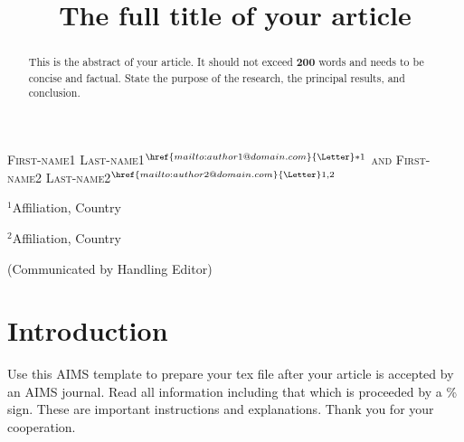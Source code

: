 \documentclass{aims} %
\title[Running head]
{The full title of your article} %
\author[First-name1 Last-name1 and First-name2 Last-name2]{}
\theoremstyle{definition}
\begin{document}
\maketitle

\centerline{\scshape
First-name1 Last-name1$^{{\href{mailto:author1@domain.com}{\textrm{\Letter}}}*1}$
and First-name2 Last-name2$^{{\href{mailto:author2@domain.com}{\textrm{\Letter}}}1,2}$}

\medskip

{\footnotesize
 \centerline{$^1$Affiliation, Country}
} %

\medskip

{\footnotesize
 \centerline{$^2$Affiliation, Country}
}

\bigskip

 \centerline{(Communicated by Handling Editor)}


\begin{abstract}
This is the abstract of your article. It should not exceed \textbf{200} words and needs to be concise and factual. State the purpose of the research, the principal results, and conclusion.
\end{abstract}


\section{Introduction}

Use this AIMS template to prepare your tex file after your article is accepted by an AIMS journal. Read all information including that which is proceeded by a \% sign. These are important instructions and explanations. Thank you for your cooperation.
\end{document}
